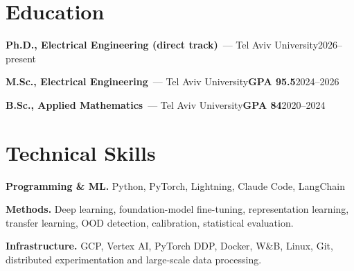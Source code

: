 \documentclass[10pt]{article}
\newcommand{\sep}{\enspace{\color{muted}|}\enspace}
\newcommand{\entry}[3]{\textbf{#1}{\color{muted}\ --- #2}\hfill{\color{muted}\small #3}\par}
\begin{document}
\section{Education}
\entry{Ph.D., Electrical Engineering \mdseries(direct track)}{Tel Aviv University}{2026--present}
\vspace{1pt}
\entry{M.Sc., Electrical Engineering}{Tel Aviv University\sep\textbf{GPA 95.5}}{2024--2026}
\vspace{1pt}
\entry{B.Sc., Applied Mathematics}{Tel Aviv University\sep\textbf{GPA 84}}{2020--2024}

\section{Technical Skills}
\textbf{Programming \& ML.} Python, PyTorch, Lightning, Claude Code, LangChain\par\vspace{2pt}
\textbf{Methods.} Deep learning, foundation-model fine-tuning, representation learning, transfer learning, OOD
detection, calibration, statistical evaluation.\par\vspace{2pt}
\textbf{Infrastructure.} GCP, Vertex AI, PyTorch DDP, Docker, W\&B, Linux, Git, distributed experimentation and
large-scale data processing.
\end{document}
